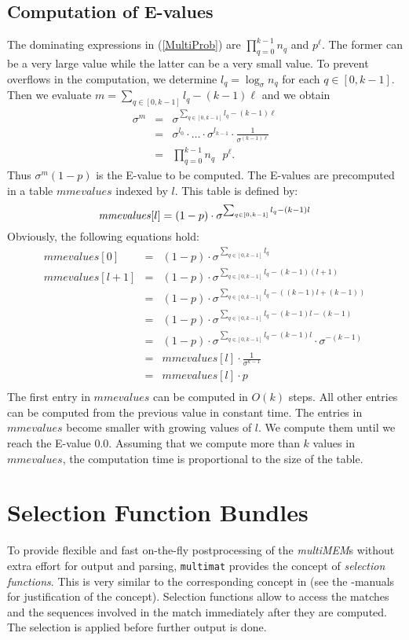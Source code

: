 \documentclass[12pt]{article}
\newcommand{\MM}{\texttt{multimat}\xspace}
\newcommand{\MMEM}[0]{\textit{multiMEM}\xspace}
\newcommand{\SingleCM}[0]{p}
\newcommand{\MMevalues}{\mathit{mmevalues}}
\begin{document}
\subsection{Computation of E-values}
The dominating expressions in (\ref{MultiProb}) are
\(\prod_{q=0}^{k-1}n_{q}\) and \(p^{\ell}\). The former can be a
very large value while the latter can be a very small value. To prevent 
overflows in the computation, we determine
\(l_{q}=\log_{\sigma}n_{q}\) for each \(q\in[0,k-1]\).
Then we evaluate \(m=\sum_{q\in[0,k-1]}l_{q}-(k-1)\ell\) and we obtain
\begin{eqnarray*}
\sigma^{m}&=&\sigma^{\sum_{q\in[0,k-1]}l_{q}-(k-1)\ell}\\
          &=&\sigma^{l_{0}}\cdot \ldots \cdot \sigma^{l_{k-1}} \cdot
                                              \frac{1}{\sigma^{(k-1)\ell}}\\
          &=&\prod_{q=0}^{k-1}n_{q}~~~\SingleCM^{\ell}.
\end{eqnarray*}
Thus \(\sigma^{m}(1-\SingleCM)\) is the E-value to be computed. 
The E-values are precomputed in a table \(\MMevalues\) indexed by
\(l\). This table is defined by:
\[
\MMevalues[l]=(1-p)\cdot\sigma^{\sum_{q\in[0,k-1]}l_{q}-(k-1)l}\\
\]
Obviously, the following equations hold:
\begin{eqnarray*}
\MMevalues[0]&=&(1-p)\cdot \sigma^{\sum_{q\in[0,k-1]}l_{q}}\\
\MMevalues[l+1]
&=&(1-p)\cdot \sigma^{\sum_{q\in[0,k-1]}l_{q}-(k-1)(l+1)}\\
&=&(1-p)\cdot \sigma^{\sum_{q\in[0,k-1]}l_{q}-((k-1)l+(k-1))}\\
&=&(1-p)\cdot \sigma^{\sum_{q\in[0,k-1]}l_{q}-(k-1)l-(k-1)}\\
&=&(1-p)\cdot \sigma^{\sum_{q\in[0,k-1]}l_{q}-(k-1)l}\cdot\sigma^{-(k-1)}\\
&=&\MMevalues[l]\cdot\frac{1}{\sigma^{k-1}}\\
&=&\MMevalues[l]\cdot p\\
\end{eqnarray*}
The first entry in \(\MMevalues\) can be computed in \(O(k)\) steps.
All other entries can be computed from the previous value in constant
time. The entries in \(\MMevalues\) become smaller with growing values
of \(l\). We compute them until we reach the E-value 0.0. Assuming that
we compute more than \(k\) values in \(\MMevalues\), the computation time
is proportional to the size of the table.

\section{Selection Function Bundles}\label{SelectionConcept}
To provide flexible and fast on-the-fly postprocessing 
of the \MMEM{s} without extra effort for output and parsing, \MM provides
the concept of \emph{selection functions}. This is very similar to 
the corresponding concept in \VM (see the \VM-manuals for justification 
of the concept). Selection functions allow to access the matches and 
the sequences involved in the match immediately after they are computed. The
selection is applied before further output is done.
\end{document}
